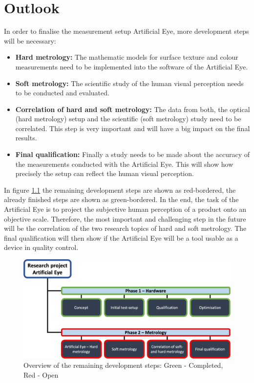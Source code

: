 \chapter{Outlook}
\label{outlook}

In order to finalise the measurement setup Artificial Eye, more development steps will be necessary:
\begin{itemize}
	\item \textbf{Hard metrology:} The mathematic models for surface texture and colour measurements need to be implemented into the software of the Artificial Eye. 
	\item \textbf{Soft metrology:} The scientific study of the human visual perception needs to be conducted and evaluated.
	\item \textbf{Correlation of hard and soft metrology:} The data from both, the optical (hard metrology) setup and the scientific (soft metrology) study need to be correlated. This step is very important and will have a big impact on the final results.
	\item \textbf{Final qualification:} Finally a study needs to be made about the accuracy of the measurements conducted with the Artificial Eye. This will show how precisely the setup can reflect the human visual perception.
\end{itemize}

In figure \ref{ChainOutlook} the remaining development steps are shown as red-bordered, the already finished steps are shown as green-bordered. In the end, the task of the Artificial Eye is to project the subjective human perception of a product onto an objective scale. Therefore, the most important and challenging step in the future will be the correlation of the two research topics of hard and soft metrology. The final qualification will then show if the Artificial Eye will be a tool usable as a device in quality control.

\begin{figure}[h]
\begin{center}
\includegraphics[width=12cm]{Pictures/ChainOutlook}
\caption[Overview of the remaining development steps]{Overview of the remaining development steps: Green - Completed, Red - Open}
\label{ChainOutlook}
\end{center}
\end{figure}